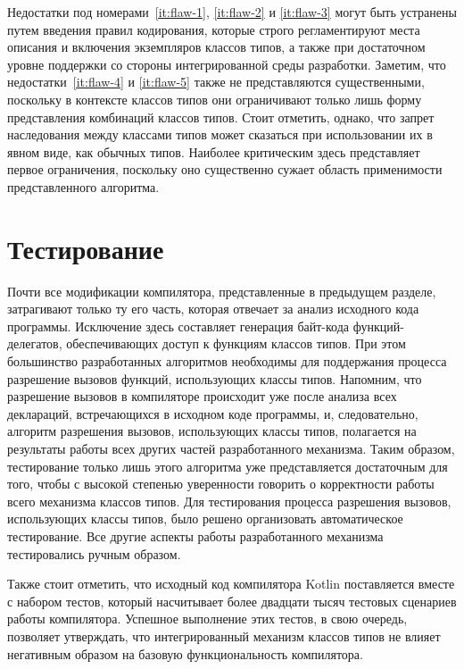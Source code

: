 Недостатки под номерами~\ref{it:flaw-1}, \ref{it:flaw-2} и \ref{it:flaw-3} могут быть устранены путем введения правил кодирования, которые строго регламентируют места описания и включения экземпляров классов типов, а также при достаточном уровне поддержки со стороны интегрированной среды разработки. Заметим, что недостатки~\ref{it:flaw-4} и \ref{it:flaw-5} также не представляются существенными, поскольку в контексте классов типов они ограничивают только лишь форму представления комбинаций классов типов. Стоит отметить, однако, что запрет наследования между классами типов может сказаться при использовании их в явном виде, как обычных типов.  Наиболее критическим здесь представляет первое ограничения, поскольку оно существенно сужает область применимости представленного алгоритма.    

\section{Тестирование}

Почти все модификации компилятора, представленные в предыдущем разделе, затрагивают только ту его часть, которая отвечает за анализ исходного кода программы. Исключение здесь составляет генерация байт-кода функций-делегатов, обеспечивающих доступ к функциям классов типов. При этом большинство разработанных алгоритмов необходимы для поддержания процесса разрешение вызовов функций, использующих классы типов. Напомним, что разрешение вызовов в компиляторе происходит уже после анализа всех деклараций, встречающихся в исходном коде программы, и, следовательно, алгоритм разрешения вызовов, использующих классы типов, полагается на результаты работы всех других частей разработанного механизма. Таким образом, тестирование только лишь этого алгоритма уже представляется достаточным для того, чтобы с высокой степенью уверенности говорить о корректности работы всего механизма классов типов. Для тестирования процесса разрешения вызовов, использующих классы типов, было решено организовать автоматическое тестирование. Все другие аспекты работы разработанного механизма тестировались ручным образом. 

Также стоит отметить, что исходный код компилятора Kotlin поставляется вместе с набором тестов, который насчитывает более двадцати тысяч тестовых сценариев работы компилятора. Успешное выполнение этих тестов, в свою очередь, позволяет утверждать, что интегрированный механизм классов типов не влияет негативным образом на базовую функциональность компилятора. 

